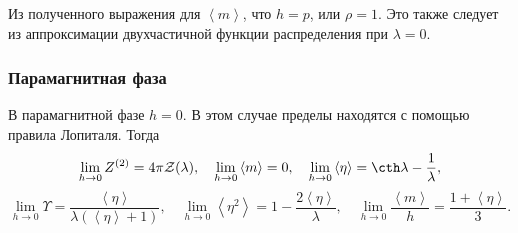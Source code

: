 \documentclass[12pt]{article}
\def\sr#1{\left<#1\right>}
\def\ZV{Z^{(2)}}
\def\Z{{\mathcal Z}}
\begin{document}
Из полученного выражения для $\sr m$, что $h=p$, или $\rho = 1$. Это также следует из аппроксимации двухчастичной функции распределения при $\lambda = 0$.

\subsubsection*{Парамагнитная фаза}
В парамагнитной фазе $h=0$. В этом случае пределы находятся с помощью правила Лопиталя. Тогда
\begin{equation*}
    \lim_{h \rightarrow 0} \ZV = 4\pi\Z(\lambda), \quad \lim_{h \rightarrow 0} \sr m = 0, \quad \lim_{h \rightarrow 0} \sr \eta = \cth \lambda - \frac{1}{\lambda},
\end{equation*}
\begin{equation*}
    \lim_{h \rightarrow 0} \Upsilon = \frac{\left<\eta\right>}{\lambda \left(\left<\eta\right> + 1\right)}, \quad \lim_{h \rightarrow 0} \sr{\eta^2} = 1 - \frac{2 \left<\eta\right>}{\lambda}, \quad \lim_{h \rightarrow 0} \frac{\sr m}{h} = \frac{1+\sr\eta}{3}.
\end{equation*}
\end{document}
